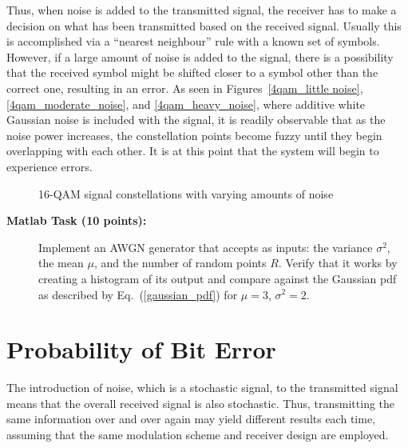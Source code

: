 \documentclass[letterpaper,12pt]{article}
\newcommand{\goodgap}{%
\hspace{\subfigtopskip}%
\hspace{\subfigbottomskip}}
\newcounter{matlabcnt}
\begin{document}
Thus, when noise is added to the transmitted signal, the receiver
has to make a decision on what has been transmitted based on the
received signal. Usually this is accomplished via a ``nearest
neighbour'' rule with a known set of symbols. However, if a large
amount of noise is added to the signal, there is a possibility
that the received symbol might be shifted closer to a symbol other
than the correct one, resulting in an error. As seen in
Figures~\ref{4qam_little noise}, \ref{4qam_moderate_noise}, and
\ref{4qam_heavy_noise}, where additive white Gaussian noise is
included with the signal, it is readily observable that as the
noise power increases, the constellation points become fuzzy until
they begin overlapping with each other. It is at this point that
the system will begin to experience errors.
\begin{figure}[t]
\begin{center}
\goodgap {}
\caption{16-QAM signal constellations with varying amounts of
noise}
\end{center}
\end{figure}

\begin{description}
    \item[{\bf Matlab Task  (10 points):}]
    Implement an AWGN generator that accepts as inputs: the
    variance $\sigma^2$, the mean $\mu$, and the number of random
    points $R$. Verify that it works by creating a histogram of
    its output and compare against the Gaussian pdf as described
    by Eq.~(\ref{gaussian_pdf}) for $\mu=3$, $\sigma^2=2$.
\end{description}



\section{Probability of Bit Error}\label{ber_section}

The introduction of noise, which is a stochastic signal, to the
transmitted signal means that the overall received signal is also
stochastic. Thus, transmitting the same information over and over
again may yield different results each time, assuming  that the
same modulation scheme and receiver design are employed.
\end{document}
